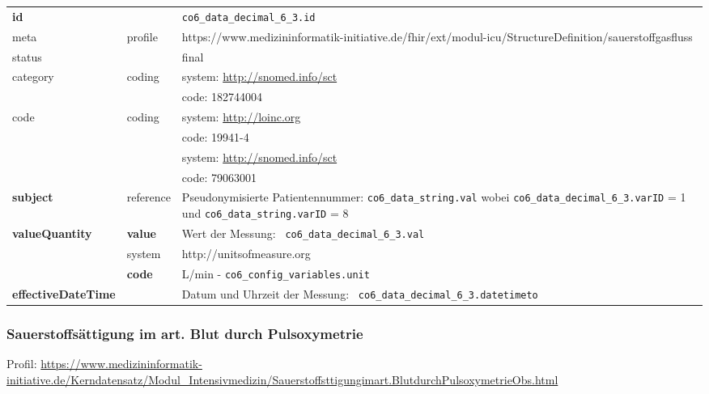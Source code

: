 \begin{longtable}{|l|l|p{7.5cm}|}
        \hline
        \rowcolor{lightgray} \multicolumn{3}{|l|}{Data Mapping (inhaltlich)} \\ \hline
        \textbf{id} &  & \texttt{co6\_data\_decimal\_6\_3.id} \\ \hline
	meta & profile & https://www.medizininformatik-initiative.de/fhir/ext/modul-icu/StructureDefinition/sauerstoffgasfluss \\ \hline 
	status &  & final   \\ \hline 
	category & coding & system: \url{http://snomed.info/sct} \\
\cline{3-3}
	& & code: 182744004 \\ \hline
	code & coding & system: \url{http://loinc.org} \\ 
	\cline{3-3} 
	&  & code: 19941-4 \\ 
	\cline{3-3} 
	&  & system: \url{http://snomed.info/sct} \\ 
	\cline{3-3}
	&  & code: 79063001 \\ \hline
	 \textbf{subject} & reference & Pseudonymisierte Patientennummer: \texttt{co6\_data\_string.val} wobei \texttt{co6\_data\_decimal\_6\_3.varID} = 1 und \texttt{co6\_data\_string.varID} = 8 \\ \hline
	 \textbf{valueQuantity}  & \textbf{value} & Wert der Messung: \texttt{
co6\_data\_decimal\_6\_3.val} \\
        \cline{2-3}
         & system & http://unitsofmeasure.org \\
         \cline{2-3}
         & \textbf{code} & L/min - \texttt{co6\_config\_variables.unit} \\ \hline
     \textbf{effectiveDateTime}  & & Datum und Uhrzeit der Messung: \texttt{
co6\_data\_decimal\_6\_3.datetimeto} \\
    \hline
\end{longtable}


\subsubsection{Sauerstoffsättigung im art. Blut durch Pulsoxymetrie} 
Profil: \url{https://www.medizininformatik-initiative.de/Kerndatensatz/Modul_Intensivmedizin/Sauerstoffsttigungimart.BlutdurchPulsoxymetrieObs.html}

